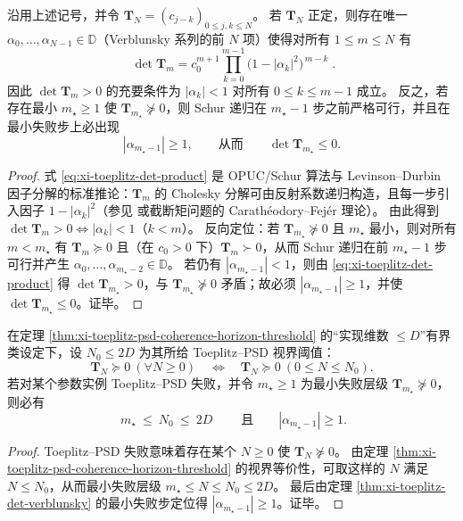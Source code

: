 \begin{theorem}\label{thm:xi-toeplitz-det-verblunsky}
沿用上述记号，并令 \(\mathbf{T}_N=(c_{j-k})_{0\le j,k\le N}\)。
若 \(\mathbf{T}_N\) 正定，则存在唯一 \(\alpha_0,\dots,\alpha_{N-1}\in\mathbb{D}\)（Verblunsky 系列的前 \(N\) 项）使得对所有 \(1\le m\le N\) 有
\begin{equation}\label{eq:xi-toeplitz-det-product}
\boxed{\;
\det \mathbf{T}_m
=c_0^{m+1}\prod_{k=0}^{m-1}\bigl(1-|\alpha_k|^2\bigr)^{\,m-k}\; }.
\end{equation}
因此 \(\det \mathbf{T}_m>0\) 的充要条件为 \(|\alpha_k|<1\) 对所有 \(0\le k\le m-1\) 成立。
反之，若存在最小 \(m_\star\ge 1\) 使 \(\mathbf{T}_{m_\star}\not\succeq 0\)，则 Schur 递归在 \(m_\star-1\) 步之前严格可行，并且在最小失败步上必出现
\[
|\alpha_{m_\star-1}|\ge 1,
\qquad\text{从而}\qquad
\det \mathbf{T}_{m_\star}\le 0.
\]
\end{theorem}

\begin{proof}
式 \eqref{eq:xi-toeplitz-det-product} 是 OPUC/Schur 算法与 Levinson--Durbin 因子分解的标准推论：\(\mathbf{T}_m\) 的 Cholesky 分解可由反射系数递归构造，且每一步引入因子 \(1-|\alpha_k|^2\)（参见 \cite[Ch.~1--2]{Simon2005OPUC1} 或截断矩问题的 Carath\'eodory--Fej\'er 理论）。
由此得到 \(\det \mathbf{T}_m>0 \Longleftrightarrow |\alpha_k|<1\)（\(k<m\)）。
反向定位：若 \(\mathbf{T}_{m_\star}\not\succeq 0\) 且 \(m_\star\) 最小，则对所有 \(m<m_\star\) 有 \(\mathbf{T}_m\succeq 0\) 且（在 \(c_0>0\) 下）\(\mathbf{T}_m\succ 0\)，从而 Schur 递归在前 \(m_\star-1\) 步可行并产生 \(\alpha_0,\dots,\alpha_{m_\star-2}\in\mathbb{D}\)。
若仍有 \(|\alpha_{m_\star-1}|<1\)，则由 \eqref{eq:xi-toeplitz-det-product} 得 \(\det\mathbf{T}_{m_\star}>0\)，与 \(\mathbf{T}_{m_\star}\not\succeq 0\) 矛盾；故必须 \(|\alpha_{m_\star-1}|\ge 1\)，并使 \(\det\mathbf{T}_{m_\star}\le 0\)。证毕。
\end{proof}

\begin{corollary}[实现维数阈值强制的反射越界层级上界]\label{cor:xi-toeplitz-reflection-overrun-index-bound}
在定理 \ref{thm:xi-toeplitz-psd-coherence-horizon-threshold} 的“实现维数 \(\le D\)”有界类设定下，设 \(N_0\le 2D\) 为其所给 Toeplitz--PSD 视界阈值：
\[
\mathbf{T}_N\succeq 0\ (\forall N\ge 0)
\quad\Longleftrightarrow\quad
\mathbf{T}_N\succeq 0\ (0\le N\le N_0).
\]
若对某个参数实例 Toeplitz--PSD 失败，并令 \(m_\star\ge 1\) 为最小失败层级
\(
\mathbf{T}_{m_\star}\not\succeq 0
\)，
则必有
\[
\boxed{\;
m_\star\ \le\ N_0\ \le\ 2D\;}
\qquad\text{且}\qquad
|\alpha_{m_\star-1}|\ge 1.
\]
\end{corollary}
\begin{proof}
Toeplitz--PSD 失败意味着存在某个 \(N\ge 0\) 使 \(\mathbf{T}_N\not\succeq 0\)。
由定理 \ref{thm:xi-toeplitz-psd-coherence-horizon-threshold} 的视界等价性，可取这样的 \(N\) 满足 \(N\le N_0\)，从而最小失败层级 \(m_\star\le N\le N_0\le 2D\)。
最后由定理 \ref{thm:xi-toeplitz-det-verblunsky} 的最小失败步定位得 \(|\alpha_{m_\star-1}|\ge 1\)。证毕。
\end{proof}

